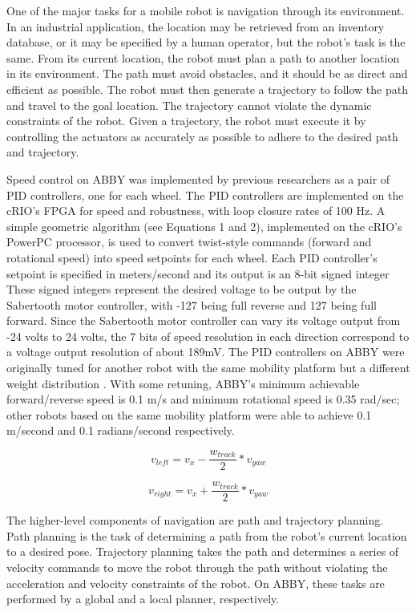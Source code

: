 \documentclass[]{cwru} %
\begin{document}
One of the major tasks for a mobile robot is navigation through its
environment. In an industrial application, the location may be retrieved
from an inventory database, or it may be specified by a human operator,
but the robot's task is the same. From its current location, the robot
must plan a path to another location in its environment. The path must
avoid obstacles, and it should be as direct and efficient as possible.
The robot must then generate a trajectory to follow the path and travel
to the goal location. The trajectory cannot violate the dynamic
constraints of the robot. Given a trajectory, the robot must execute it
by controlling the actuators as accurately as possible to adhere to the
desired path and trajectory.

Speed control on ABBY was implemented by previous researchers as a pair
of PID controllers, one for each wheel. The PID controllers are
implemented on the cRIO's FPGA for speed and robustness, with loop
closure rates of 100 Hz. A simple geometric algorithm (see Equations 1
and 2), implemented on the cRIO's PowerPC processor, is used to convert
twist-style commands (forward and rotational speed) into speed setpoints
for each wheel. Each PID controller's setpoint is specified in
meters/second and its output is an 8-bit signed integer These signed
integers represent the desired voltage to be output by the Sabertooth
motor controller, with -127 being full reverse and 127 being full
forward. Since the Sabertooth motor controller can vary its voltage
output from -24 volts to 24 volts, the 7 bits of speed resolution in
each direction correspond to a voltage output resolution of about 189mV.
The PID controllers on ABBY were originally tuned for another robot with
the same mobility platform but a different weight distribution \cite{yanick}.
With some retuning, ABBY's minimum achievable forward/reverse speed is
0.1 m/s and minimum rotational speed is 0.35 rad/sec; other robots based
on the same mobility platform were able to achieve 0.1 m/second and 0.1
radians/second respectively.

\begin{equation}
\label{eq1}
 v_{left} = v_x - \frac{w_{track}}{2} * v_{yaw}
\end{equation}

\begin{equation}
\label{eq2}
v_{right} = v_x + \frac{w_{track}}{2} * v_{yaw}
\end{equation}

The higher-level components of navigation are path and trajectory
planning. Path planning is the task of determining a path from the
robot's current location to a desired pose. Trajectory planning takes
the path and determines a series of velocity commands to move the robot
through the path without violating the acceleration and velocity
constraints of the robot. On ABBY, these tasks are performed by a global
and a local planner, respectively.
\end{document}
